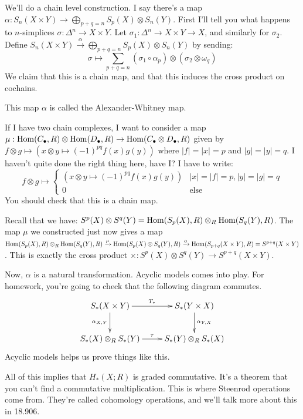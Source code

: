 We'll do a chain level construction. I say there's a map $\alpha:S_n(X\times Y)\to \bigoplus_{p+q=n}S_p(X)\otimes S_n(Y)$. First I'll tell you what happens to $n$-simplices $\sigma:\Delta^n\to X\times Y$. Let $\sigma_1:\Delta^n\to X\times Y\to X$, and similarly for $\sigma_2$. Define $S_n(X\times Y)\xrightarrow{\alpha} \bigoplus_{p+q=n}S_p(X)\otimes S_n(Y)$ by sending:
\begin{equation*}
\sigma\mapsto\sum_{p+q=n}(\sigma_1\circ\alpha_p)\otimes(\sigma_2\otimes\omega_q)
\end{equation*}
We claim that this is a chain map, and that this induces the cross product on cochains.
\begin{remark}
This map $\alpha$ is called the Alexander-Whitney map.
\end{remark}
If I have two chain complexes, I want to consider a map $\mu:\operatorname{Hom}(C_\bullet,R)\otimes \operatorname{Hom}(D_\bullet,R)\to \operatorname{Hom}(C_\bullet\otimes D_\bullet,R)$ given by $f\otimes g\mapsto(x\otimes y\mapsto (-1)^{pq}f(x)g(y))$ where $|f|=|x|=p$ and $|g|=|y|=q$. I haven't quite done the right thing here, have I? I have to write:
\begin{equation*}
f\otimes g\mapsto\begin{cases}
(x\otimes y\mapsto (-1)^{pq}f(x)g(y)) & |x|=|f|=p, |y|=|g|=q\\
0 & \text{else}
\end{cases}
\end{equation*}
You should check that this is a chain map.

Recall that we have: $S^p(X)\otimes S^q(Y)=\operatorname{Hom}(S_p(X),R)\otimes_R \operatorname{Hom}(S_q(Y),R)$. The map $\mu$ we constructed just now gives a map $\operatorname{Hom}(S_p(X),R)\otimes_R \operatorname{Hom}(S_q(Y),R)\xrightarrow{\mu}\operatorname{Hom}(S_p(X)\otimes S_q(Y),R)\xrightarrow{\alpha}\operatorname{Hom}(S_{p+q}(X\times Y),R)=S^{p+q}(X\times Y)$. This is exactly the cross product $\times:S^p(X)\otimes S^q(Y)\to S^{p+q}(X\times Y)$.

Now, $\alpha$ is a natural transformation. Acyclic models comes into play. For homework, you're going to check that the following diagram commutes.
\begin{equation*}
\xymatrix{S_\ast(X\times Y)\ar[r]^{T_\ast}\ar[d]_{\alpha_{X,Y}} & S_\ast(Y\times X)\ar[d]^{\alpha_{Y,X}}\\
S_\ast(X)\otimes_R S_\ast(Y)\ar[r]^{\tau} & S_\ast(Y)\otimes_R S_\ast(X)}
\end{equation*}
Acyclic models helps us prove things like this.

All of this implies that $ H_\ast(X;R)$ is graded commutative. It's a theorem that you can't find a commutative multiplication. This is where Steenrod operations come from. They're called cohomology operations, and we'll talk more about this in 18.906.

